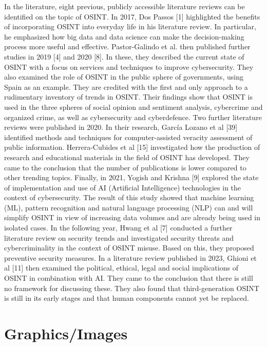 \documentclass[10pt]{article}
\begin{document}
In the literature, eight previous, publicly accessible literature reviews can be identified on the topic of OSINT. In 2017, Dos Passos [1] highlighted the benefits of incorporating OSINT into everyday life in his literature review. In particular, he emphasized how big data and data science can make the decision-making process more useful and effective. Pastor-Galindo et al. then published further studies in 2019 [4] and 2020 [8]. In these, they described the current state of OSINT with a focus on services and techniques to improve cybersecurity. They also examined the role of OSINT in the public sphere of governments, using Spain as an example. They are credited with the first and only approach to a rudimentary inventory of trends in OSINT. Their findings show that OSINT is used in the three spheres of social opinion and sentiment analysis, cybercrime and organized crime, as well as cybersecurity and cyberdefence. Two further literature reviews were published in 2020. In their research, García Lozano et al [39] identified methods and techniques for computer-assisted veracity assessment of public information. Herrera-Cubides et al [15] investigated how the production of research and educational materials in the field of OSINT has developed. They came to the conclusion that the number of publications is lower compared to other trending topics. Finally, in 2021, Yogish and Krishna [9] explored the state of implementation and use of AI (Artificial Intelligence) technologies in the context of cybersecurity. The result of this study showed that machine learning (ML), pattern recognition and natural language processing (NLP) can and will simplify OSINT in view of increasing data volumes and are already being used in isolated cases. In the following year, Hwang et al [7] conducted a further literature review on security trends and investigated security threats and cybercriminality in the context of OSINT misuse. Based on this, they proposed preventive security measures. In a literature review published in 2023, Ghioni et al [11] then examined the political, ethical, legal and social implications of OSINT in combination with AI. They came to the conclusion that there is still no framework for discussing these. They also found that third-generation OSINT is still in its early stages and that human components cannot yet be replaced.



\section{Graphics/Images}
\end{document}
